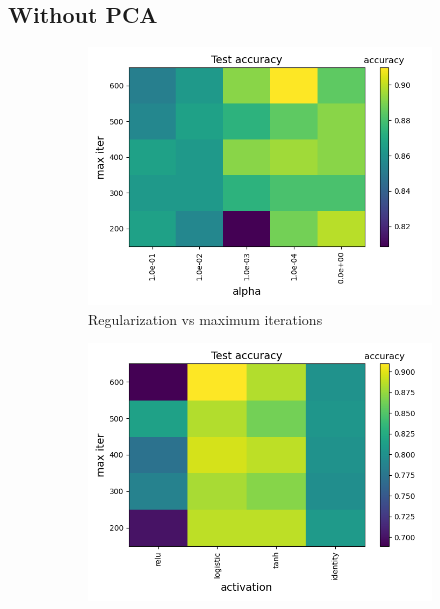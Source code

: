 \documentclass[a4paper]{article}
\begin{document}
\subsection{Without PCA}
\begin{figure}[H]
  \centering
  \begin{subfigure}{0.49\textwidth}
    \includegraphics[scale=0.45]{../figures/neural_net/heatmaps/heatmap_nbins200_pca0_seed4155_ts0.20_accuracy_alpha_max_iter.png}
    \caption{Regularization vs maximum iterations}
  \end{subfigure}
  \begin{subfigure}{0.49\textwidth}
    \includegraphics[scale=0.45]{../figures/neural_net/heatmaps/heatmap_nbins200_pca0_seed4155_ts0.20_accuracy_activation_max_iter.png}

\end{subfigure}
\end{figure}
\end{document}
